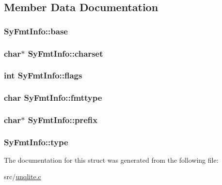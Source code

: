 \subsection{Member Data Documentation}
\hypertarget{struct_sy_fmt_info_a26e5a10d4048ba6804f12ba4fd632030}{
\subsubsection[{base}]{ Sy\-Fmt\-Info\-::base}}\label{d9/db7/struct_sy_fmt_info_a26e5a10d4048ba6804f12ba4fd632030}
\hypertarget{struct_sy_fmt_info_a4743a7fd035362903618210eb5df764c}{
\subsubsection[{charset}]{\setlength{\rightskip}{0pt plus 5cm}char$\ast$ Sy\-Fmt\-Info\-::charset}}\label{d9/db7/struct_sy_fmt_info_a4743a7fd035362903618210eb5df764c}
\hypertarget{struct_sy_fmt_info_adc19d695ba16daeb2e86a782c0f2ec0d}{
\subsubsection[{flags}]{\setlength{\rightskip}{0pt plus 5cm}int Sy\-Fmt\-Info\-::flags}}\label{d9/db7/struct_sy_fmt_info_adc19d695ba16daeb2e86a782c0f2ec0d}
\hypertarget{struct_sy_fmt_info_afba298c0415421490f830cfbc86816ca}{
\subsubsection[{fmttype}]{\setlength{\rightskip}{0pt plus 5cm}char Sy\-Fmt\-Info\-::fmttype}}\label{d9/db7/struct_sy_fmt_info_afba298c0415421490f830cfbc86816ca}
\hypertarget{struct_sy_fmt_info_a1c9cb49a751fd9f9dc31186d9544111a}{
\subsubsection[{prefix}]{\setlength{\rightskip}{0pt plus 5cm}char$\ast$ Sy\-Fmt\-Info\-::prefix}}\label{d9/db7/struct_sy_fmt_info_a1c9cb49a751fd9f9dc31186d9544111a}
\hypertarget{struct_sy_fmt_info_a6f5b00dfa6489fb31def05f16fdfbc70}{
\subsubsection[{type}]{ Sy\-Fmt\-Info\-::type}}\label{d9/db7/struct_sy_fmt_info_a6f5b00dfa6489fb31def05f16fdfbc70}


The documentation for this struct was generated from the following file\-:\begin{DoxyCompactItemize}
\item 
src/\hyperlink{unqlite_8c}{unqlite.\-c}\end{DoxyCompactItemize}
